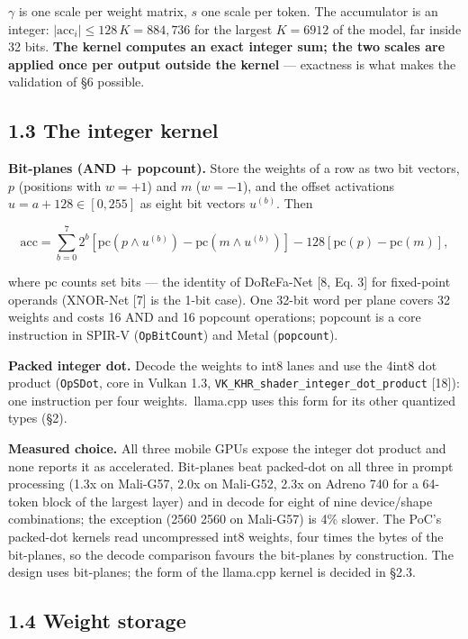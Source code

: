 \documentclass[
  10pt,
]{article}
\newcounter{none} %
\begin{document}
\(\gamma\) is one scale per weight matrix, \(s\) one scale per token.
The accumulator is an integer:
\(|\mathrm{acc}_i| \le128\,K = 884{,}736\) for the largest \(K = 6912\)
of the model, far inside 32 bits. \textbf{The kernel computes an exact
integer sum; the two scales are applied once per output outside the
kernel} --- exactness is what makes the validation of \S{}6 possible.

\subsection{1.3 The integer kernel}\label{the-integer-kernel}

\textbf{Bit-planes (AND + popcount).} Store the weights of a row as two
bit vectors, \(p\) (positions with \(w = +1\)) and \(m\) (\(w = -1\)),
and the offset activations \(u = a + 128 \in[0, 255]\) as eight bit
vectors \(u^{(b)}\). Then

\[
\mathrm{acc} = \sum_{b=0}^{7} 2^{b}\left[\mathrm{pc}(p \wedge u^{(b)}) -
\mathrm{pc}(m \wedge u^{(b)})\right] - 128\left[\mathrm{pc}(p) - \mathrm{pc}(m)\right],
\]

where \(\mathrm{pc}\) counts set bits --- the identity of DoReFa-Net
[8, Eq. 3] for fixed-point operands (XNOR-Net [7] is the 1-bit
case). One 32-bit word per plane covers 32 weights and costs 16 AND and
16 popcount operations; popcount is a core instruction in SPIR-V
(\texttt{OpBitCount}) and Metal (\texttt{popcount}).

\textbf{Packed integer dot.} Decode the weights to int8 lanes and use
the 4\texttimes{}int8 dot product (\texttt{OpSDot}, core in Vulkan 1.3,
\texttt{VK\_KHR\_shader\_integer\_dot\_product} [18]): one
instruction per four weights.\ llama.cpp uses this form for its other
quantized types (\S{}2).

\textbf{Measured choice.} All three mobile GPUs expose the integer dot
product and none reports it as accelerated. Bit-planes beat packed-dot
on all three in prompt processing (1.3x on Mali-G57, 2.0x on Mali-G52,
2.3x on Adreno 740 for a 64-token block of the largest layer) and in
decode for eight of nine device/shape combinations; the exception (2560
\texttimes{} 2560 on Mali-G57) is 4\% slower. The PoC's packed-dot kernels read
uncompressed int8 weights, four times the bytes of the bit-planes, so
the decode comparison favours the bit-planes by construction. The design
uses bit-planes; the form of the llama.cpp kernel is decided in \S{}2.3.

\subsection{1.4 Weight storage}\label{weight-storage}
\end{document}
